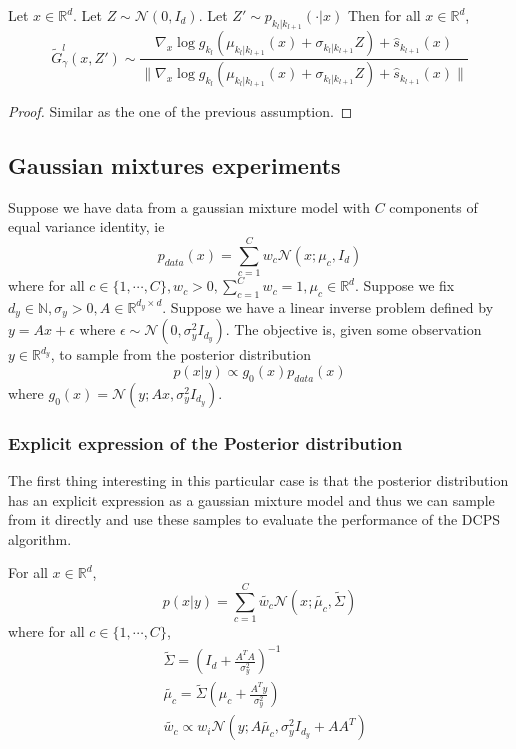 \documentclass[12pt]{article}
\begin{document}
\begin{assumption}
    Let $x\in \mathbb{R}^d$.
    Let $Z \sim \mathcal{N}(0, I_d)$.
    Let $Z' \sim p_{k_l|k_{l+1}}(\cdot | x)$
    Then for all $x \in \mathbb{R}^d$,
    $$\tilde{G}_\gamma^l(x, Z') \sim \frac{\nabla_x \log g_{k_l}(\mu_{k_l|k_{l+1}}(x) + \sigma_{k_l|k_{l+1}} Z) + \hat{s}_{k_{l+1}}(x)}
    {\| \nabla_x \log g_{k_l}(\mu_{k_l|k_{l+1}}(x) + \sigma_{k_l|k_{l+1}} Z) + \hat{s}_{k_{l+1}}(x) \|}$$
\end{assumption}

\begin{proof}
Similar as the one of the previous assumption.
\end{proof}

\subsection{Gaussian mixtures experiments}

Suppose we have data from a gaussian mixture model with $C$ components of equal variance identity, ie 
$$p_{data}(x) = \sum_{c=1}^C w_c \mathcal{N}(x; \mu_c, I_d)$$
where for all $c \in \{1, \cdots, C\}, w_c > 0, \sum_{c=1}^C w_c = 1, \mu_c \in \mathbb{R}^d$.
Suppose we fix $d_y \in \mathbb{N}, \sigma_y > 0, A \in \mathbb{R}^{d_y \times d}$.
Suppose we have a linear inverse problem defined by 
$y = A x + \epsilon$ where $\epsilon \sim \mathcal{N}(0, \sigma_y^2 I_{d_y})$. The objective is, 
given some observation $y \in \mathbb{R}^{d_y}$, to sample from the posterior distribution 
$$p(x|y) \propto g_0(x) p_{data}(x)$$
where $g_0(x) = \mathcal{N}(y; Ax, \sigma_y^2 I_{d_y})$.

\subsubsection{Explicit expression of the Posterior distribution}

The first thing interesting in this  particular case is that the posterior distribution
has an explicit expression as a gaussian mixture model and thus we can sample from it directly
and use these samples to evaluate the performance of the DCPS algorithm.

\begin{assumption}
    For all $x \in \mathbb{R}^d$,
    $$p(x|y) = \sum_{c=1}^C \tilde{w_c} \mathcal{N}(x; \tilde{\mu_c}, \tilde{\Sigma})$$
    where for all $c \in \{1, \cdots, C\}$,
    \begin{align*}
        & \tilde{\Sigma} = (I_d + \frac{A^T A}{\sigma_y^2})^{-1} \\
        & \tilde{\mu_c} = \tilde{\Sigma} (\mu_c + \frac{A^T y}{\sigma_y^2}) \\
        & \tilde{w_c} \propto w_i \mathcal{N}(y; A \tilde{\mu_c}, \sigma_y^2I_{d_y} + A A^T)
    \end{align*}
\end{assumption}
\end{document}
